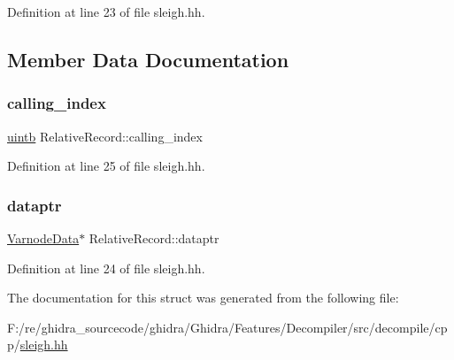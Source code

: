 Definition at line 23 of file sleigh.\+hh.



\subsection{Member Data Documentation}
\mbox{\label{struct_relative_record_aec0e3f94be30f9591788f7cd45425667}} 
\subsubsection{\texorpdfstring{calling\_index}{calling\_index}}
{\footnotesize\ttfamily \mbox{\hyperlink{types_8h_a2db313c5d32a12b01d26ac9b3bca178f}{uintb}} Relative\+Record\+::calling\+\_\+index}



Definition at line 25 of file sleigh.\+hh.

\mbox{\label{struct_relative_record_a850f0350cbee0663232960529ed4f271}} 
\subsubsection{\texorpdfstring{dataptr}{dataptr}}
{\footnotesize\ttfamily \mbox{\hyperlink{struct_varnode_data}{Varnode\+Data}}$\ast$ Relative\+Record\+::dataptr}



Definition at line 24 of file sleigh.\+hh.



The documentation for this struct was generated from the following file\+:\begin{DoxyCompactItemize}
\item 
F\+:/re/ghidra\+\_\+sourcecode/ghidra/\+Ghidra/\+Features/\+Decompiler/src/decompile/cpp/\mbox{\hyperlink{sleigh_8hh}{sleigh.\+hh}}\end{DoxyCompactItemize}
